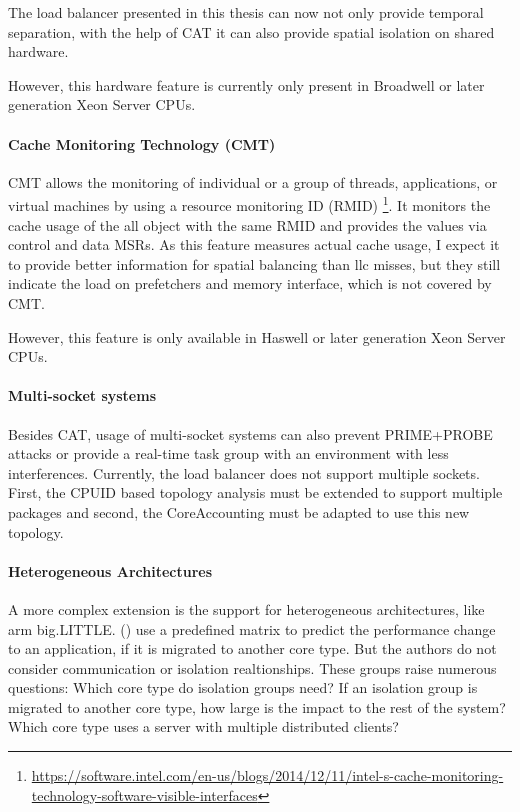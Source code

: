The load balancer presented in  this thesis can now not only provide temporal
separation, with the help of CAT it can also provide spatial isolation on
shared hardware.

However, this hardware feature is currently only present in Broadwell or later
generation Xeon Server CPUs.

\paragraph{Cache Monitoring Technology (CMT)}
CMT allows the monitoring of individual or a group of threads, applications, or
virtual machines by using a resource monitoring ID (RMID)
\footnote{
  \url{https://software.intel.com/en-us/blogs/2014/12/11/intel-s-cache-monitoring-technology-software-visible-interfaces}}.
It monitors the cache usage of the all object with the same RMID and provides
the values via control and data MSRs.
As this feature measures actual cache usage, I expect it to provide better
information for spatial balancing than \gls{llc} misses, but they still
indicate the load on prefetchers and memory interface, which is not covered by
CMT.

However, this feature is only available in Haswell or later generation
Xeon Server CPUs.

\paragraph{Multi-socket systems}
Besides CAT, usage of multi-socket systems can also prevent PRIME+PROBE attacks
or provide a real-time task group with an environment with less interferences.
Currently, the load balancer does not support multiple sockets.
First, the CPUID based topology analysis must be extended to support multiple
packages and second, the CoreAccounting must be adapted to use this new
topology.

\paragraph{Heterogeneous Architectures}
A more complex extension is the support for heterogeneous architectures, like
\gls{arm} big.LITTLE.
\citeauthor{sarma_smartbalance_2015} (\cite{sarma_smartbalance_2015}) use a
predefined matrix to predict the performance change to an application,
if it is migrated to another core type.
But the authors do not consider communication or isolation realtionships.
These groups raise numerous questions: Which core type do isolation groups
need?
If an isolation group is migrated to another core type, how large is the impact
to the rest of the system?
Which core type uses a server with multiple distributed clients?

